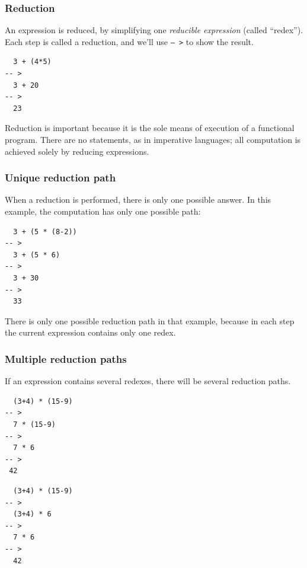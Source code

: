 \documentclass{beamer}
\begin{document}
\begin{frame}[fragile]
\frametitle{Reduction}

An expression is reduced, by simplifying one \emph{reducible
  expression} (called ``redex'').  Each step is called a reduction,
and we'll use \texttt{-- >} to show the result.

\begin{verbatim}
  3 + (4*5)
-- >
  3 + 20
-- >
  23
\end{verbatim}

Reduction is important because it is the sole means of execution of a
functional program.  There are no statements, as in imperative
languages; all computation is achieved solely by reducing expressions.

\end{frame}

\begin{frame}[fragile]
\frametitle{Unique reduction path}


When a reduction is performed, there is only one possible answer.  In
this example, the computation has only one possible path:

\begin{verbatim}
  3 + (5 * (8-2))
-- >
  3 + (5 * 6)
-- >
  3 + 30
-- >
  33
\end{verbatim}

There is only one possible reduction path in that example, because
in each step the current expression contains only one redex.

\end{frame}

\begin{frame}[fragile]
\frametitle{Multiple reduction paths}

If an expression contains several redexes, there will be several
reduction paths.

\vspace{1em}
\begin{center}
\begin{minipage}{5cm}

\begin{verbatim}
  (3+4) * (15-9)
-- >
  7 * (15-9)    
-- >
  7 * 6         
-- >
 42            
\end{verbatim}

\end{minipage}
\begin{minipage}{5cm}

\begin{verbatim}
  (3+4) * (15-9)
-- >
  (3+4) * 6
-- >
  7 * 6
-- >
  42
\end{verbatim}

\end{minipage}
\end{center}

\end{frame}
\end{document}
